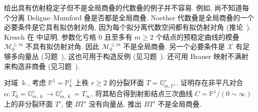 \begin{remark}[非商叠]\label{src:7.2.7}
给出具有仿射稳定子但不是全局商叠的代数叠的例子并不容易. 例如, 尚不知道每个分离 Deligne--Mumford 叠是否都是全局商叠. Noether 代数叠是全局商叠的一个必要条件是它具有拟仿射对角, 因为每个拟分离代数空间都有拟仿射对角 (推论~). Kresch 在 \cite[命题 5.2]{Kre13} 中证明, 参数化亏格 $0$ 且至多有 $m\geq2$ 个结点的预稳定曲线的模叠 $\mathcal M_0^{\leq m}$ 不具有拟仿射对角. 因此 $\mathcal M_0^{\leq m}$ 不是全局商叠. 另一个必要条件是 $\mathcal X$ 有足够多向量丛 (习题~), 这也可用于构造反例 (见习题~). 还可用 Brauer 映射不满射来构造非商叠 (见习题~).
\end{remark}
\begin{exercise}\label{src:7.2.8}
对域 $\Bbbk$, 考虑 $\mathbb P^1=\mathbb P^1_{\Bbbk}$ 上秩 $r\geq2$ 的分裂环面 $T=\mathbb G_{m,\mathbb P^1}^r$. 证明存在非平凡对合 $\alpha:T_0=\mathbb G_{m,\Bbbk}^r\to\mathbb G_{m,\Bbbk}^r=T_\infty$, 将其粘合得到射影结点三次曲线 $C=\mathbb P^1/(0\sim\infty)$ 上的非分裂环面 $T'$, 使 $BT'$ 没有向量丛. 推出 $BT'$ 不是全局商叠.
\end{exercise}
